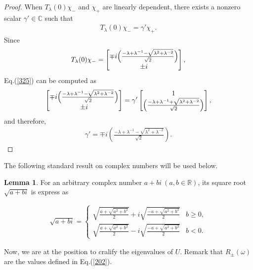 \documentclass[a4paper,12pt]{article}
\theoremstyle{plain}
\theoremstyle{definition}
\newtheorem{lemma}[thm]{Lemma}
\theoremstyle{definition}
\begin{document}
\begin{proof}
When $T_{\lambda}(0)\chi_{-}$ and $\chi_{+}$ are linearly dependent, there exists a nonzero scalar $\gamma' \in \mathbb{C}$ such that
\begin{eqnarray}
\label{325}
T_{\lambda}(0)\chi_{-} = \gamma' \chi_{+}. 
\end{eqnarray}
Since
\begin{eqnarray}
T_{\lambda}(0)\chi_{-}=
\begin{bmatrix}
   \mp i\Bigl(\frac{-\lambda +\lambda^{-1}-\sqrt{\lambda^2+\lambda^{-2}}}{\sqrt{2}}\Bigr) \\
   \pm i
\end{bmatrix}, \nonumber 
\end{eqnarray}
Eq.(\ref{325}) can be computed as
\begin{eqnarray}
\begin{bmatrix}
   \mp i\Bigl(\frac{-\lambda +\lambda^{-1}-\sqrt{\lambda^2+\lambda^{-2}}}{\sqrt{2}}\Bigr) \\
   \pm i
\end{bmatrix} \nonumber 
=\gamma' 
\begin{bmatrix}
   1 \\
    \Bigl(\frac{-\lambda +\lambda^{-1}+\sqrt{\lambda^2+\lambda^{-2}}}{\sqrt{2}}
    \Bigr)
\end{bmatrix},
\end{eqnarray}
and therefore,
\begin{align*}
\gamma'  = \mp i\left(\frac{-\lambda +\lambda^{-1}-\sqrt{\lambda^2+\lambda^{-2}}}{\sqrt{2}}\right).
\end{align*}
\end{proof}

The following standard result on complex numbers will be used below.
\begin{lemma}\label{lemma46}
For an arbitrary complex number $a+bi \ (a,b\in \mathbb{R})$, its square root $\sqrt{a+bi}$ is express as 

\begin{eqnarray}
\sqrt{a+bi} = \left\{
\begin{array}{ll}
\sqrt{\frac{a+\sqrt{a^2+b^2}}{2}}+i\sqrt{\frac{-a+\sqrt{a^2+b^2}}{2}} &  b\geq0,\\
\sqrt{\frac{a+\sqrt{a^2+b^2}}{2}}-i\sqrt{\frac{-a+\sqrt{a^2+b^2}}{2}} & b<0.
\end{array}
\right. \nonumber 
\end{eqnarray}
\end{lemma}

Now, we are at the position to cralify the eigenvalues of $U$. 
Remark that $R_{\pm}(\omega)$ are the values defined in Eq.(\ref{202}).
\end{document}
